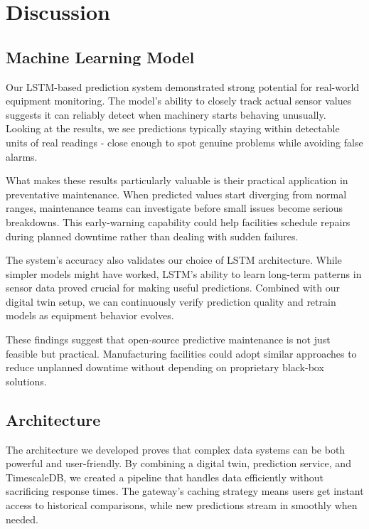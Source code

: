 \chapter{Discussion}
\label{chap:discussion}
\setlength{\parskip}{1em}

\section{Machine Learning Model}
Our LSTM-based prediction system demonstrated strong potential for real-world equipment monitoring. The model's ability to closely track actual sensor values suggests it can reliably detect when machinery starts behaving unusually. Looking at the results, we see predictions typically staying within detectable units of real readings - close enough to spot genuine problems while avoiding false alarms.

What makes these results particularly valuable is their practical application in preventative maintenance. When predicted values start diverging from normal ranges, maintenance teams can investigate before small issues become serious breakdowns. This early-warning capability could help facilities schedule repairs during planned downtime rather than dealing with sudden failures.

The system's accuracy also validates our choice of LSTM architecture. While simpler models might have worked, LSTM's ability to learn long-term patterns in sensor data proved crucial for making useful predictions. Combined with our digital twin setup, we can continuously verify prediction quality and retrain models as equipment behavior evolves.

These findings suggest that open-source predictive maintenance is not just feasible but practical. Manufacturing facilities could adopt similar approaches to reduce unplanned downtime without depending on proprietary black-box solutions.

\section{Architecture}
The architecture we developed proves that complex data systems can be both powerful and user-friendly. By combining a digital twin, prediction service, and TimescaleDB, we created a pipeline that handles data efficiently without sacrificing response times. The gateway's caching strategy means users get instant access to historical comparisons, while new predictions stream in smoothly when needed.

